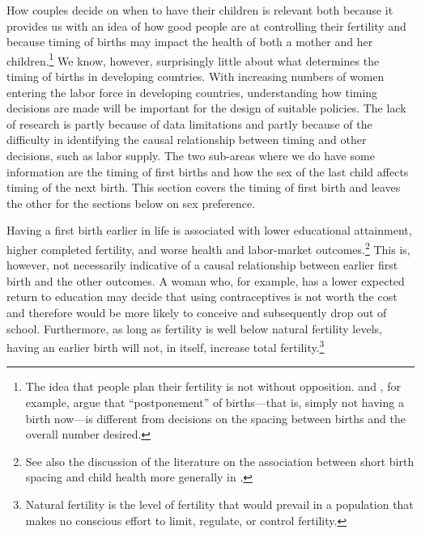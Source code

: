 How couples decide on when to have their children is relevant both because it provides us with an idea of how good people are at controlling their fertility and because timing of births may impact the health of both a mother and her children.\footnote{The idea that people plan their fertility is not without opposition. \citet{Timaeus2008} and \citet{Moultrie2012}, for example, argue that ``postponement'' of births---that is, simply not having a birth now---is different from decisions on the spacing between births and the overall number desired.} We know, however, surprisingly little about what determines the timing of births in developing countries. With increasing numbers of women entering the labor force in developing countries, understanding how timing decisions are made will be important for the design of suitable policies. The lack of research is partly because of data limitations and partly because of the difficulty in identifying the causal relationship between timing and other decisions, such as labor supply. The two sub-areas where we do have some information are the timing of first births and how the sex of the last child affects timing of the next birth. This section covers the timing of first birth and leaves the other for the sections below on sex preference.

Having a first birth earlier in life is associated with lower educational attainment, higher completed fertility, and worse health and labor-market outcomes.\footnote{See also the discussion of the literature on the association between short birth spacing and child health more generally in \citet{Casterline2016}.} This is, however, not necessarily indicative of a causal relationship between earlier first birth and the other outcomes. A woman who, for example, has a lower expected return to education may decide that using contraceptives is not worth the cost and therefore would be more likely to conceive and subsequently drop out of school. Furthermore, as long as fertility is well below natural fertility levels, having an earlier birth will not, in itself, increase total fertility.\footnote{Natural fertility is the level of fertility that would prevail in a population that makes no conscious effort to limit, regulate, or control fertility.}

